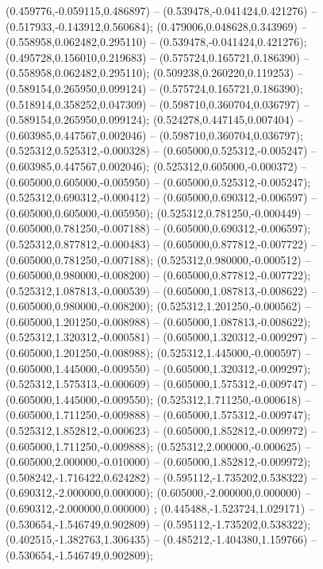  (0.459776,-0.059115,0.486897) -- (0.539478,-0.041424,0.421276) -- (0.517933,-0.143912,0.560684);
 (0.479006,0.048628,0.343969) -- (0.558958,0.062482,0.295110) -- (0.539478,-0.041424,0.421276);
 (0.495728,0.156010,0.219683) -- (0.575724,0.165721,0.186390) -- (0.558958,0.062482,0.295110);
 (0.509238,0.260220,0.119253) -- (0.589154,0.265950,0.099124) -- (0.575724,0.165721,0.186390);
 (0.518914,0.358252,0.047309) -- (0.598710,0.360704,0.036797) -- (0.589154,0.265950,0.099124);
 (0.524278,0.447145,0.007404) -- (0.603985,0.447567,0.002046) -- (0.598710,0.360704,0.036797);
 (0.525312,0.525312,-0.000328) -- (0.605000,0.525312,-0.005247) -- (0.603985,0.447567,0.002046);
 (0.525312,0.605000,-0.000372) -- (0.605000,0.605000,-0.005950) -- (0.605000,0.525312,-0.005247);
 (0.525312,0.690312,-0.000412) -- (0.605000,0.690312,-0.006597) -- (0.605000,0.605000,-0.005950);
 (0.525312,0.781250,-0.000449) -- (0.605000,0.781250,-0.007188) -- (0.605000,0.690312,-0.006597);
 (0.525312,0.877812,-0.000483) -- (0.605000,0.877812,-0.007722) -- (0.605000,0.781250,-0.007188);
 (0.525312,0.980000,-0.000512) -- (0.605000,0.980000,-0.008200) -- (0.605000,0.877812,-0.007722);
 (0.525312,1.087813,-0.000539) -- (0.605000,1.087813,-0.008622) -- (0.605000,0.980000,-0.008200);
 (0.525312,1.201250,-0.000562) -- (0.605000,1.201250,-0.008988) -- (0.605000,1.087813,-0.008622);
 (0.525312,1.320312,-0.000581) -- (0.605000,1.320312,-0.009297) -- (0.605000,1.201250,-0.008988);
 (0.525312,1.445000,-0.000597) -- (0.605000,1.445000,-0.009550) -- (0.605000,1.320312,-0.009297);
 (0.525312,1.575313,-0.000609) -- (0.605000,1.575312,-0.009747) -- (0.605000,1.445000,-0.009550);
 (0.525312,1.711250,-0.000618) -- (0.605000,1.711250,-0.009888) -- (0.605000,1.575312,-0.009747);
 (0.525312,1.852812,-0.000623) -- (0.605000,1.852812,-0.009972) -- (0.605000,1.711250,-0.009888);
 (0.525312,2.000000,-0.000625) -- (0.605000,2.000000,-0.010000) -- (0.605000,1.852812,-0.009972);
 (0.508242,-1.716422,0.624282) -- (0.595112,-1.735202,0.538322) -- (0.690312,-2.000000,0.000000);
 (0.605000,-2.000000,0.000000) -- (0.690312,-2.000000,0.000000) ;
 (0.445488,-1.523724,1.029171) -- (0.530654,-1.546749,0.902809) -- (0.595112,-1.735202,0.538322);
 (0.402515,-1.382763,1.306435) -- (0.485212,-1.404380,1.159766) -- (0.530654,-1.546749,0.902809);
